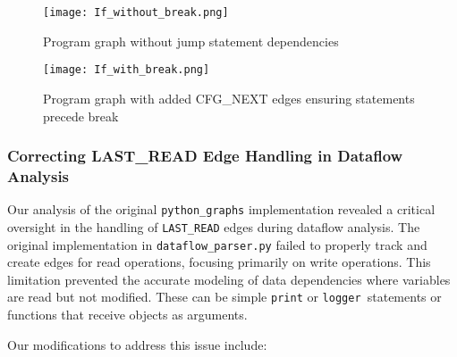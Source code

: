 \documentclass[%
thesis=student,%
coverpage=false,%
titlepage=false,%
headmarks=true, %
english,%
font=libertine, %
math=newpxtx, %
BCOR=5mm,%
coverBCOR=11mm%
]{tum-templates/book/tumbook}
\begin{document}
\begin{figure}[htbp]
    \centering
    \texttt{[image: If\_without\_break.png]}
    \caption{Program graph without jump statement dependencies}
    \label{fig:If_without_break}
\end{figure}

\begin{figure}[htbp]
    \centering
    \texttt{[image: If\_with\_break.png]}
    \caption{Program graph with added CFG\_NEXT edges ensuring statements precede break}
    \label{If_with_break}
\end{figure}


\subsubsection{Correcting LAST\_READ Edge Handling in Dataflow Analysis}

Our analysis of the original \texttt{python\_graphs} implementation revealed a critical oversight in the handling of \texttt{LAST\_READ} edges during dataflow analysis. The original implementation in \texttt{dataflow\_parser.py} failed to properly track and create edges for read operations, focusing primarily on write operations. This limitation prevented the accurate modeling of data dependencies where variables are read but not modified. These can be simple \texttt{print} or \texttt{logger }statements or functions that receive objects as arguments.

Our modifications to address this issue include:
\end{document}
